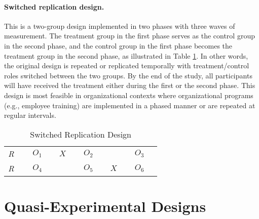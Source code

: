 \paragraph{Switched replication design.} This is a two-group design implemented in two phases with three waves of measurement. The treatment group in the first phase serves as the control group in the second phase, and the control group in the first phase becomes the treatment group in the second phase, as illustrated in Table \ref{09:tab07}. In other words, the original design is repeated or replicated temporally with treatment/control roles switched between the two groups. By the end of the study, all participants will have received the treatment either during the first or the second phase. This design is most feasible in organizational contexts where organizational programs (e.g., employee training) are implemented in a phased manner or are repeated at regular intervals.

\begin{table}[H]
	\centering
	\begin{tabularx}{0.75\linewidth}{p{0.10\linewidth}p{0.10\linewidth}p{0.10\linewidth}p{0.10\linewidth}p{0.10\linewidth}p{0.10\linewidth}}
		\toprule
		\textit{R} & $ O_1 $ & $ X $ & $ O_2 $ &       & $ O_3 $ \\
		\textit{R} & $ O_4 $ &       & $ O_5 $ & $ X $ & $ O_6 $ \\
		\bottomrule
	\end{tabularx}
	\caption{Switched Replication Design}
	\label{09:tab07}
\end{table}

\section{Quasi-Experimental Designs}

